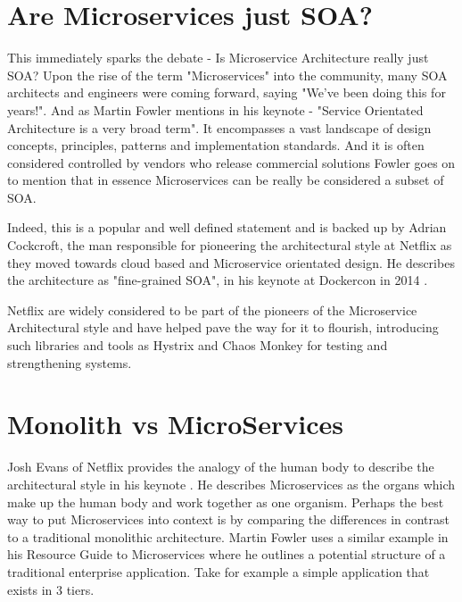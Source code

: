 \section{Are Microservices just SOA?}

This immediately sparks the debate - Is Microservice Architecture really just SOA? Upon the rise of the term "Microservices" into the community, many SOA architects and engineers were coming forward, saying "We've been doing this for years!". And as Martin Fowler mentions in his keynote\cite{GOTOConference} - "Service Orientated Architecture is a very broad term". It encompasses a vast landscape of design concepts, principles, patterns and implementation standards. And it is often considered controlled by vendors who release commercial solutions Fowler goes on to mention that in essence Microservices can be really be considered a subset of SOA.

Indeed, this is a popular and well defined statement and is backed up by Adrian Cockcroft, the man responsible for pioneering the architectural style at Netflix as they moved towards cloud based and Microservice orientated design. He describes the architecture as "fine-grained SOA", in his keynote at Dockercon in 2014 \cite{adriancockcroft}.

Netflix are widely considered to be part of the pioneers of the Microservice Architectural style and have helped pave the way for it to flourish, introducing such libraries and tools as Hystrix\cite{Hystrix} and Chaos Monkey\cite{ChaosMonkey} for testing and strengthening systems.

\section{Monolith vs MicroServices}

Josh Evans of Netflix provides the analogy of the human body to describe the architectural style in his keynote \cite{MasteringChaosNetflix}. He describes Microservices as the organs which make up the human body and work together as one organism.
Perhaps the best way to put Microservices into context is by comparing the differences in contrast to a traditional monolithic architecture. Martin Fowler uses a similar example in his Resource Guide to Microservices where he outlines a potential structure of a traditional enterprise application. \cite{MicroservicesResourceGuide} Take for example a simple application that exists in 3 tiers.

